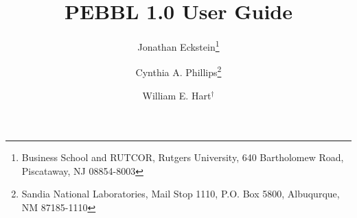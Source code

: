 \documentclass[12pt,letter]{article}
\begin{document}
\title{
PEBBL 1.0 User Guide
}

\author{
Jonathan Eckstein\thanks{
Business School and RUTCOR, Rutgers University,
640 Bartholomew Road, Piscataway, NJ 08854-8003
}
\and
Cynthia A. Phillips\thanks{
Sandia National Laboratories, Mail Stop 1110, P.O. Box
5800, Albuqurque, NM 87185-1110}
\and
William E. Hart$^{\dagger}$
}

\maketitle

\begin{abstract}

\end{abstract}

\newpage

\tableofcontents

\newpage



%
\end{document}
